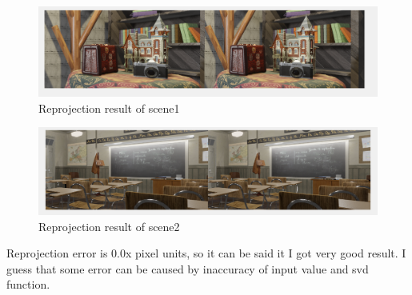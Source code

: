 \begin{figure}[h]
    \centering
    \includegraphics[width=12cm]{result3.png}
    \caption{Reprojection result of scene1}
    \label{fig:result1}
\end{figure}

\begin{figure}[h]
    \centering
    \includegraphics[width=12cm]{result6.png}
    \caption{Reprojection result of scene2}
    \label{fig:result1}
\end{figure}


Reprojection error is 0.0x pixel units, so it can be said it I got very good result. I guess that some error can be caused by inaccuracy of input value and svd function.


